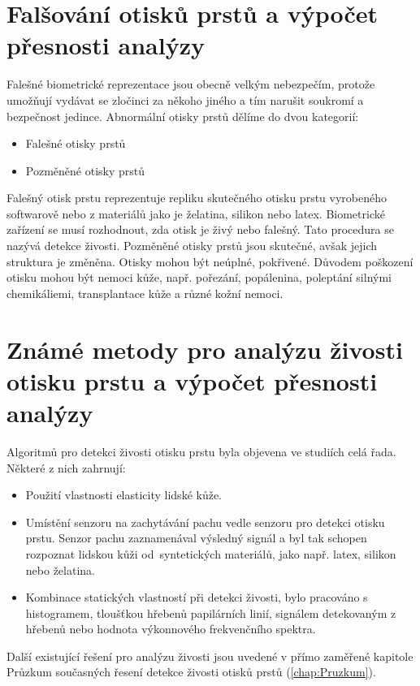 \section{Falšování otisků prstů a výpočet přesnosti analýzy}
Falešné biometrické reprezentace jsou obecně velkým nebezpečím, protože umožňují vydávat se zločinci za někoho jiného a tím narušit soukromí a bezpečnost jedince. Abnormální otisky prstů dělíme do dvou kategorií:
\begin{itemize}
    \item Falešné otisky prstů
    \item Pozměněné otisky prstů
\end{itemize}
Falešný otisk prstu reprezentuje repliku skutečného otisku prstu vyrobeného softwarově nebo z materiálů jako je želatina, silikon nebo latex. Biometrické zařízení se musí rozhodnout, zda otisk je živý nebo falešný. Tato procedura se nazývá detekce živosti.
Pozměněné otisky prstů jsou skutečné, avšak jejich struktura je změněna. Otisky mohou být neúplné, pokřivené. Důvodem poškození otisku mohou být nemoci kůže, např. pořezání, popálenina, poleptání silnými chemikáliemi, transplantace kůže a různé kožní nemoci.\cite{Petrovici}
\section{Známé metody pro analýzu živosti otisku prstu a výpočet přesnosti analýzy}
Algoritmů pro detekci živosti otisku prstu byla objevena ve studiích celá řada. Některé z nich zahrnují:\cite{AbhiskekStudy}
\begin{itemize}
    \item Použití vlastnosti elasticity lidské kůže.
    \item Umístění senzoru na zachytávání pachu vedle senzoru pro detekci otisku prstu. Senzor pachu zaznamenával výsledný signál a byl tak schopen rozpoznat lidskou kůži od~syntetických materiálů, jako např. latex, silikon nebo želatina.
    \item Kombinace statických vlastností při detekci živosti, bylo pracováno s histogramem, tloušťkou hřebenů papilárních linií, signálem detekovaným z hřebenů nebo hodnota výkonnového frekvenčního spektra.
    
\end{itemize}

Další existující řešení pro analýzu živosti jsou uvedené v přímo zaměřené kapitole Průzkum současných řesení detekce živosti otisků prstů (\autoref{chap:Pruzkum}).


